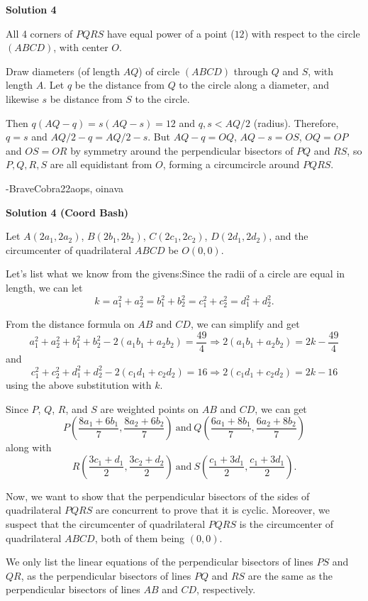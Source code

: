 \begin{enumerate}
\textbf{Solution 4}

All 4 corners of $PQRS$ have equal power of a point ($12$) with respect to the circle $(ABCD)$, with center $O$.

 Draw diameters (of length $AQ$) of circle $(ABCD)$ through $Q$ and $S$, with length $A$.  Let $q$ be the distance from $Q$ to the circle along a diameter, and  likewise $s$ be distance from $S$ to the circle.

 Then $q(AQ-q) = s(AQ-s) = 12$ and $q,s < AQ/2$ (radius). Therefore, $q=s$ and $AQ/2 -q = AQ/2 -s$. But $AQ-q=OQ$, $AQ-s=OS$, $OQ = OP$ and $OS = OR$ by symmetry around the perpendicular bisectors of $PQ$ and $RS$, so $P,Q,R,S$ are all equidistant from $O$, forming a circumcircle around $PQRS$.

 -BraveCobra22aops, oinava

 


 



\textbf{Solution 4 (Coord Bash)}

Let $A(2a_1,2a_2)$, $B(2b_1,2b_2)$, $C(2c_1,2c_2)$, $D(2d_1,2d_2)$, and the circumcenter of quadrilateral $ABCD$ be $O(0,0)$.

 Let's list what we know from the givens:Since the radii of a circle are equal in length, we can let 
 \[k=a_1^2+a_2^2=b_1^2+b_2^2=c_1^2+c_2^2=d_1^2+d_2^2.\]

 From the distance formula on $AB$ and $CD$, we can simplify and get 
 \[a_1^2+a_2^2+b_1^2+b_2^2-2(a_1b_1+a_2b_2)=\frac{49}{4} \Rightarrow 2(a_1b_1+a_2b_2)=2k-\frac{49}{4}\] and 
 \[c_1^2+c_2^2+d_1^2+d_2^2-2(c_1d_1+c_2d_2)=16 \Rightarrow 2(c_1d_1+c_2d_2)=2k-16\] using the above substitution with $k$.

 Since $P$, $Q$, $R$, and $S$ are weighted points on $AB$ and $CD$, we can get 
 \[P\left(\frac{8a_1+6b_1}{7},\frac{8a_2+6b_2}{7}\right) \ \text{and} \ Q\left(\frac{6a_1+8b_1}{7},\frac{6a_2+8b_2}{7}\right)\] along with 
 \[R\left(\frac{3c_1+d_1}{2},\frac{3c_2+d_2}{2}\right) \ \text{and} \ S\left(\frac{c_1+3d_1}{2},\frac{c_1+3d_1}{2}\right).\]

 Now, we want to show that the perpendicular bisectors of the sides of quadrilateral $PQRS$ are concurrent to prove that it is cyclic. Moreover, we suspect that the circumcenter of quadrilateral $PQRS$ is the circumcenter of quadrilateral $ABCD$, both of them being $(0,0)$.

 We only list the linear equations of the perpendicular bisectors of lines $PS$ and $QR$, as the perpendicular bisectors of lines $PQ$ and $RS$ are the same as the perpendicular bisectors of lines $AB$ and $CD$, respectively.


\end{enumerate}
